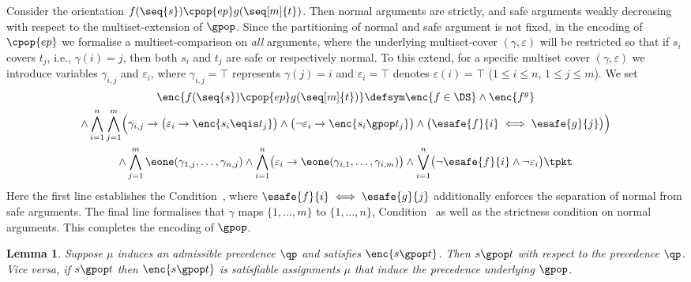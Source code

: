 \documentclass{LMCS}
\newtheorem{lemma}[thm]{Lemma}
\begin{document}
Consider the orientation $f(\seq{s}) \cpop{ep} g(\seq[m]{t})$. 
Then normal arguments are strictly, and safe arguments weakly decreasing with 
respect to the multiset-extension of $\gpop$. 
Since the partitioning of normal and safe argument is not fixed, 
in the encoding of $\cpop{ep}$ we formalise a multiset-comparison on \emph{all} arguments, 
where the underlying multiset-cover $(\gamma, \varepsilon)$ 
will be restricted so that if $s_i$ covers $t_j$, i.e., $\gamma(i) = j$, 
then both $s_i$ and $t_j$ are safe or respectively normal.
To this extend, for a specific multiset cover $(\gamma, \varepsilon)$ we introduce variables $\gamma_{i,j}$ and 
$\varepsilon_i$, where $\gamma_{i,j} = \top$ represents $\gamma(j) = i$ and
$\varepsilon_i = \top$ denotes $\varepsilon(i) = \top$ ($1 \leqslant i \leqslant n$, $1 \leqslant j \leqslant m$).
We set
\begin{multline*}
  \enc{f(\seq{s}) \cpop{ep} g(\seq[m]{t})} \defsym 
  \enc{f \in \DS}
  \wedge \enc{f \sp g} \\
  \wedge 
  \bigwedge_{i=1}^{n} \bigwedge_{j=1}^{m} \Bigl( \gamma_{i,j} \to \bigl( \varepsilon_i \to \enc{s_i \eqis t_j} \bigr)
                                             \wedge \bigl( \neg \varepsilon_i \to \enc{s_i \gpop t_j} \bigr)
                                             \wedge \bigl( \esafe{f}{i} \iff \esafe{g}{j} \bigr)
                                      \Bigr) \\
\wedge \bigwedge_{j=1}^m \eone(\gamma_{1,j},\dots,\gamma_{n,j}) \wedge \bigwedge_{i=1}^{n} \bigl(\varepsilon_i \to \eone(\gamma_{i,1},\dots,\gamma_{i,m})\bigr) 
\wedge  \bigvee_{i=1}^n \bigl( \neg \esafe{f}{i} \wedge \neg \varepsilon_i \bigr)  \tpkt
\end{multline*}
Here the first line establishes the Condition~, where
$\esafe{f}{i} \iff \esafe{g}{j}$ additionally enforces the separation of normal from safe arguments.
The final line formalises
that $\gamma$ maps $\{1,\dots,m\}$ to $\{1,\dots,n\}$, Condition~
as well as the strictness condition on normal arguments.
This completes the encoding of $\gpop$.

\begin{lemma}
  Suppose $\mu$ induces an admissible precedence $\qp$ and satisfies $\enc{s \gpop t}$. 
  Then $s \gpop t$ with respect to the precedence $\qp$.
  Vice versa, if $s \gpop t$ then $\enc{s \gpop t}$ is satisfiable assignments $\mu$ 
  that induce the precedence underlying $\gpop$.
\end{lemma}
\end{document}
